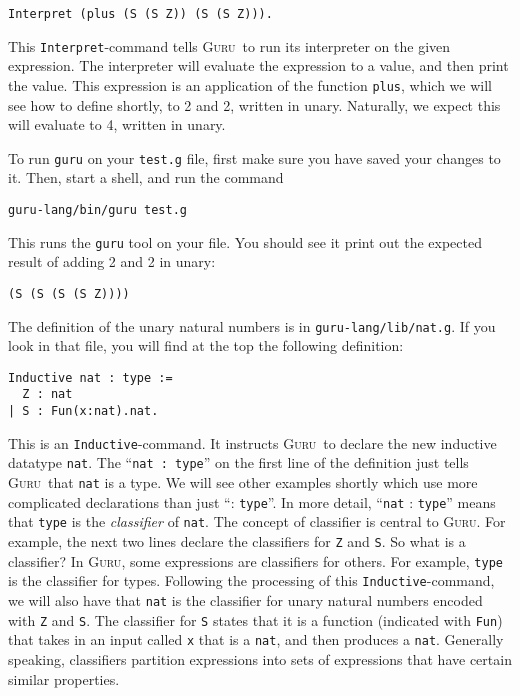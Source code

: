 \documentclass{book}[12pt]
\newcommand{\guru}[0]{\textsc{Guru}}
\begin{document}
\begin{verbatim}
Interpret (plus (S (S Z)) (S (S Z))).
\end{verbatim}

\noindent This \texttt{Interpret}-command tells \guru\ to run its
interpreter on the given expression.  The interpreter will evaluate
the expression to a value, and then print the value.  This expression
is an application of the function \texttt{plus}, which we will see how
to define shortly, to 2 and 2, written in unary.  Naturally, we expect
this will evaluate to 4, written in unary.

To run \texttt{guru} on your \texttt{test.g} file, first make sure
you have saved your changes to it.  Then, start a shell, and run
the command

\begin{verbatim}
guru-lang/bin/guru test.g
\end{verbatim}

\noindent This runs the \texttt{guru} tool on your file.  You should
see it print out the expected result of adding 2 and 2 in unary:

\begin{verbatim}
(S (S (S (S Z))))
\end{verbatim}

The definition of the unary natural numbers is in
\texttt{guru-lang/lib/nat.g}.  If you look in that file, you will find
at the top the following definition:

\begin{verbatim}
Inductive nat : type :=
  Z : nat
| S : Fun(x:nat).nat.
\end{verbatim}

\noindent This is an \texttt{Inductive}-command.  It instructs \guru\
to declare the new inductive datatype \texttt{nat}.  The ``\texttt{nat
: type}'' on the first line of the definition just tells \guru\ that
\texttt{nat} is a type.  We will see other examples shortly which use
more complicated declarations than just ``: \texttt{type}''.  In more
detail, ``\texttt{nat} : \texttt{type}'' means that \texttt{type} is
the \emph{classifier} of \texttt{nat}.  The concept of classifier is
central to \guru.  For example, the next two lines declare the
classifiers for \texttt{Z} and \texttt{S}.  So what is a classifier?
In \guru, some expressions are classifiers for others.  For example,
\texttt{type} is the classifier for types.  Following the processing
of this \texttt{Inductive}-command, we will also have that
\texttt{nat} is the classifier for unary natural numbers encoded with
\texttt{Z} and \texttt{S}.  The classifier for \texttt{S} states that
it is a function (indicated with \texttt{Fun}) that takes in an input
called \texttt{x} that is a \texttt{nat}, and then produces a
\texttt{nat}.  Generally speaking, classifiers partition expressions
into sets of expressions that have certain similar properties.
\end{document}
